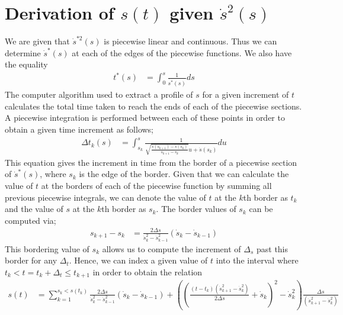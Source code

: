 \chapter{Derivation of $s(t)$ given $\dot{s}^{2}(s)$}
We are given that $\dot{s}^{*2}(s)$ is piecewise linear and continuous. Thus we can determine $\dot{s}^*(s)$ at each of the edges of the piecewise functions. We also have the equality
\begin{align*}
t^*(s) &= \int^s_0\frac{1}{\dot{s^*}(s)}ds
\end{align*} 
The computer algorithm used to extract a profile of $s$ for a given increment of $t$ calculates the total time taken to reach the ends of each of the piecewise sections. A piecewise integration is performed between each of these points in order to obtain a given time increment as follows;
\begin{align*}
\Delta t_k(s) &= \int_{s_k}^s \frac{1}{\sqrt{\frac{\dot{s}(s_{k+1}) - \dot{s}(s_{k})}{s_{k+1} - s_{k}}} u + \dot{s}(s_{k})} du
\end{align*}
This equation gives the increment in time from the border of a piecewise section of $\dot{s}^*(s)$, where $s_k$ is the edge of the border.
Given that we can calculate the value of $t$ at the borders of each of the piecewise function by summing all previous piecewise integrals, we can denote the value of $t$ at the $k$th border as $t_k$ and the value of $s$ at the $k$th border as $s_k$. The border values of $s_k$ can be computed via;
\begin{align*}
s_{k+1} - s_k &= \frac{2\Delta s}{\dot{s}^2_k - \dot{s}^2_{k-1}} \left(\dot{s}_k -\dot{s}_{k-1}\right)
\end{align*}
This bordering value of $s_k$ allows us to compute the increment of $\Delta_s$ past this border for any $\Delta_t$. Hence, we can index a given value of $t$ into the interval where $t_k < t = t_k + \Delta_t \leq t_{k+1}$ in order to obtain the relation
\begin{align*}
s(t) &= \sum_{k=1}^{s_k < s(t_k)} \frac{2\Delta s}{\dot{s}^2_k - \dot{s}^2_{k-1}} \left(\dot{s}_k -\dot{s}_{k-1}\right) + \left(\left(\frac{(t-t_{k})(\dot{s}^2_{k+1} - \dot{s}^2_{k})}{2 \Delta s} + \dot{s}_k\right)^2 - \dot{s}^2_k \right)\frac{\Delta s}{(\dot{s}^2_{k+1} - \dot{s}^2_{k})}\\	
\end{align*}